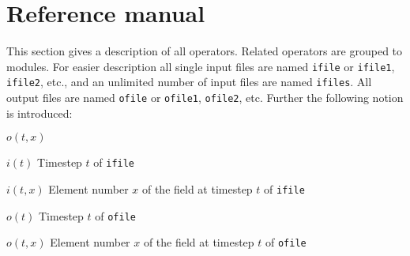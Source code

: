 \chapter{\label{refman}Reference manual}

This section gives a description of all operators.
Related operators are grouped to modules.
For easier description all single input files are named {\tt ifile} or {\tt ifile1}, {\tt ifile2}, etc.,
and an unlimited number of input files are named {\tt ifiles}.
All output files are named {\tt ofile} or {\tt ofile1}, {\tt ofile2}, etc.
Further the following notion is introduced:
\begin{defalist}{\(o(t,x)\)}
\item[\(i(t)\)\hfill]
Timestep \(t\) of {\tt ifile}
\item[\(i(t,x)\)\hfill]
Element number \(x\) of the field at timestep \(t\) of {\tt ifile}
\item[\(o(t)\)\hfill]
Timestep \(t\) of {\tt ofile}
\item[\(o(t,x)\)\hfill]
Element number \(x\) of the field at timestep \(t\) of {\tt ofile}
\end{defalist}




